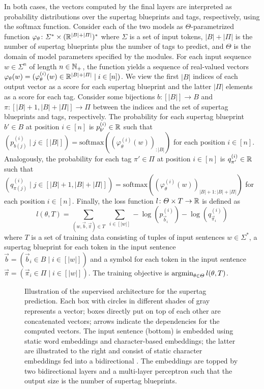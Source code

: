 \documentclass[../../document.tex]{subfiles}
\begin{document}
    In both cases, the vectors computed by the final layers are interpreted as probability distributions over the supertag blueprints and  tags, respectively, using the softmax function.
    Consider each of the two models as \(\varTheta\)-parametrized function \(\varphi_\theta\colon \varSigma^* \times (\mathbb{R}^{|B|+|\varPi|})^*\) where \(\varSigma\) is a set of input tokens, \(|B|+|\varPi|\) is the number of supertag blueprints plus the number of  tags to predict, and \(\varTheta\) is the domain of model parameters specified by the modules.
    For each input sequence \(w \in \varSigma^n\) of length \(n \in \mathbb{N}_+\), the function yields a sequence of real-valued vectors \(\varphi_\theta(w) = (\varphi^{(i)}_\theta(w) \in \mathbb{R}^{|B|+|\varPi|} \mid i \in [n])\).
    We view the first \(|B|\) indices of each output vector as a score for each supertag blueprint and the latter \(|\varPi|\) elements as a score for each  tag.
    Consider some bijections \(b\colon [|B|] \to B\) and \(\pi\colon [|B|+1, |B|+|\varPi|] \to \varPi\) between the indices and the set of supertag blueprints and  tags, respectively.
    The probability for each supertag blueprint \(b' \in B\) at position \(i \in [n]\) is \(p_{b'}^{(i)} \in \mathbb{R}\) such that \((p_{b(j)}^{(i)} \mid j \in [|B|]) = \mathrm{softmax}((\varphi^{(i)}_\theta(w))_{:|B|})\) for each position \(i\in [n]\).
    Analogously, the probability for each  tag \(\pi' \in \varPi\) at position \(i \in [n]\) is \(q_{\pi'}^{(i)} \in \mathbb{R}\) such that \((q_{\pi(j)}^{(i)} \mid j \in [|B|+1, |B|+|\varPi|]) = \mathrm{softmax}((\varphi^{(i)}_\theta(w))_{|B|+1:|B|+|\varPi|})\) for each position \(i\in [n]\).
    Finally, the loss function \(l\colon \varTheta \times T \to \mathbb{R}\) is defined as \[
        l(\theta, T) = \sum_{(w, \vec{b}, \vec{\pi}) \in T} \; \sum_{i \in [|w|]} - \log(p_{\vec{b}_i}^{(i)}) - \log(q_{\vec{\pi}_i}^{(i)})
    \]
    where \(T\) is a set of training data consisting of tuples of input sentences \(w \in \varSigma^*\), a supertag blueprint for each token in the input sentence \(\vec{b} = (\vec{b}_i \in B \mid i \in [|w|])\) and a  symbol for each token in the input sentence \(\vec{\pi} = (\vec{\pi}_i \in \varPi \mid i \in [|w|])\).
    The training objective is \(\operatorname{arg min}_{\theta \in \varTheta} l(\theta, T)\).

    \begin{figure}
        \centering
        
        \caption{\label{fig:architecture:supervised}
            Illustration of the supervised  architecture for the supertag prediction.
            Each box with circles in different shades of gray represents a vector; boxes directly put on top of each other are concatenated vectors; arrows indicate the dependencies for the computed vectors.
            The input sentence (bottom) is embedded using static word embeddings and character-based embeddings; the latter are illustrated to the right and consist of static character embeddings fed into a bidirectional .
            The embeddings are topped by two bidirectional  layers and a multi-layer perceptron such that the output size is the number of supertag blueprints.
        }
    \end{figure}
\end{document}
